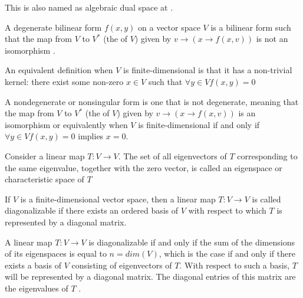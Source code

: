 \begin{appendices}
\begin{definition}
  This is also named as algebraic dual space at \cite{wiki:dualspace}.
  \label{def:dualspace}
\end{definition}

\begin{definition}
  A degenerate bilinear form $f(x, y)$ on a vector space $V$ is a
  bilinear form such that the map from $V$ to $V^\ast$ (the
  of $V$) given by $v \to (x \to f(x, v) )$ is not an isomorphism
  \cite{wiki:dbf}. 

  An equivalent definition when $V$ is finite-dimensional is that it
  has a non-trivial kernel: there exist some non-zero $x \in V$ such
  that 
  \(
  \forall y \in V f(x,y) = 0
  \)
  \label{def:degeneratebf}
\end{definition}

\begin{definition}
  A nondegenerate or nonsingular form is one that is not degenerate,
  meaning that the map from $V$ to $V^\ast$ (the 
  of $V$) given by $v \to (x \to f(x, v) )$ is an isomorphism
  \cite{wiki:dbf} or equivalently when $V$ is finite-dimensional if
  and only if
  \(
  \forall y \in V f(x,y) = 0
  \)
  implies $x = 0$.
  \label{def:nondegeneratebf}
\end{definition}

\begin{definition}[Eigenspace]
  Consider a linear map $T: V \to V$.
  The set of all eigenvectors of $T$ corresponding to the same
  eigenvalue, together with the zero vector, is called an eigenspace
  or characteristic space of $T$ \cite{wiki:eigenvalues}
  \label{def:eigenspace}
\end{definition}

\begin{definition}
  If $V$ is a finite-dimensional vector space, then a linear map
  $T: V \to V$ is called diagonalizable if there exists an ordered
  basis of $V$ with respect to which $T$ is represented by a diagonal
  matrix.

  A linear map $T: V \to V$ is diagonalizable if and only if the sum
  of the dimensions of its 
  eigenspaces is equal to $n = dim(V)$, which is the case if and only if
  there exists a basis of $V$ consisting of eigenvectors of $T$. With
  respect to such a basis, $T$ will be represented by a diagonal
  matrix. The diagonal entries of this matrix are the eigenvalues of
  $T$ \cite{wiki:diagonalizable_matrix}.
  \label{def:diagonalizable_map}
\end{definition}


\end{appendices}
